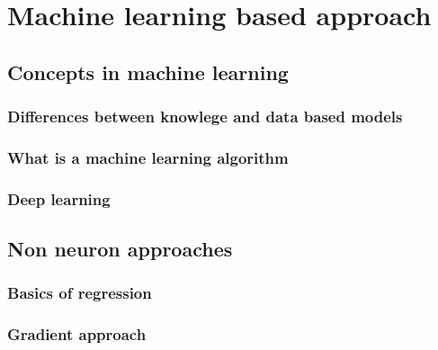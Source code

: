 \chapter{Machine learning based approach}


\section{Concepts in machine learning}

\subsection{Differences between knowlege and data based models}

\subsection{What is a machine learning algorithm}

\subsection{Deep learning}

\section{Non neuron approaches}

\subsection{Basics of regression}

\subsection{Gradient approach}

